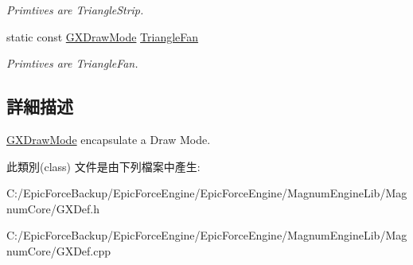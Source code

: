 \begin{DoxyCompactItemize}
\begin{DoxyCompactList}\small\item\em Primtives are Triangle\+Strip. \end{DoxyCompactList}\item 
static const \hyperlink{class_magnum_1_1_g_x_draw_mode}{G\+X\+Draw\+Mode} \hyperlink{class_magnum_1_1_g_x_draw_mode_a0578a7a0c0507e7a3d62dd060ed30cf4}{Triangle\+Fan}\hypertarget{class_magnum_1_1_g_x_draw_mode_a0578a7a0c0507e7a3d62dd060ed30cf4}{}\label{class_magnum_1_1_g_x_draw_mode_a0578a7a0c0507e7a3d62dd060ed30cf4}

\begin{DoxyCompactList}\small\item\em Primtives are Triangle\+Fan. \end{DoxyCompactList}\end{DoxyCompactItemize}


\subsection{詳細描述}
\hyperlink{class_magnum_1_1_g_x_draw_mode}{G\+X\+Draw\+Mode} encapsulate a Draw Mode. 

此類別(class) 文件是由下列檔案中產生\+:\begin{DoxyCompactItemize}
\item 
C\+:/\+Epic\+Force\+Backup/\+Epic\+Force\+Engine/\+Epic\+Force\+Engine/\+Magnum\+Engine\+Lib/\+Magnum\+Core/G\+X\+Def.\+h\item 
C\+:/\+Epic\+Force\+Backup/\+Epic\+Force\+Engine/\+Epic\+Force\+Engine/\+Magnum\+Engine\+Lib/\+Magnum\+Core/G\+X\+Def.\+cpp\end{DoxyCompactItemize}
